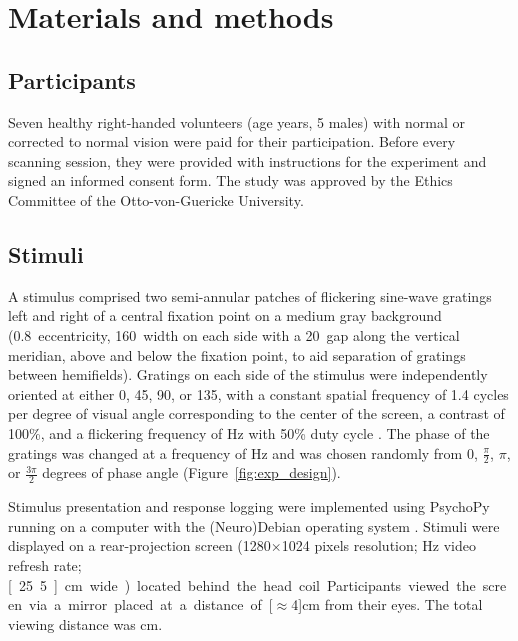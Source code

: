 \section*{Materials and methods}

\subsection*{Participants}

\noindent Seven healthy right-handed volunteers (age \unit[21-38]{years}, 5
males) with normal or corrected to normal vision were paid for their
participation. Before every scanning session, they were provided with
instructions for the experiment and signed an informed consent form. The study
was approved by the Ethics Committee of the Otto-von-Guericke University.

\subsection*{Stimuli}

\noindent A stimulus comprised two semi-annular patches of flickering sine-wave
gratings left and right of a central fixation point on a medium gray background
(0.8\textdegree\ eccentricity, 160\textdegree\ width on each
side with a 20\textdegree\ gap along the vertical meridian, above and below the
fixation point, to aid separation of gratings between hemifields). Gratings on
each side of the stimulus were independently oriented at either 0\textdegree,
45\textdegree, 90\textdegree, or 135\textdegree, with a constant spatial
frequency of 1.4 cycles per degree of visual angle corresponding to the 
center of the screen, a contrast of 100\%, and a flickering frequency of 
\unit[4]{Hz} with 50\% duty cycle \citep[][]{swisher_2010}. The phase of the
gratings was changed at a frequency of \unit[4]{Hz} and was chosen randomly
from 0, $\frac{\pi}{2}$, $\pi$, or $\frac{3\pi}{2}$ degrees of phase angle
(Figure~\ref{fig:exp_design}).

Stimulus presentation and response logging were implemented using PsychoPy
\citep[v1.79; ][]{peirce_2008} running on a computer with the (Neuro)Debian
operating system \citep{HH12}. Stimuli were displayed on a rear-projection
screen (1280$\times$1024 pixels resolution; \unit[60]{Hz} video refresh rate;
\unit[25.5]{cm} wide) located behind the head coil. Participants viewed the
screen via a mirror placed at a distance of \unit[$\approx$4]{cm} from their
eyes. The total viewing distance was \unit[100]{cm}.

